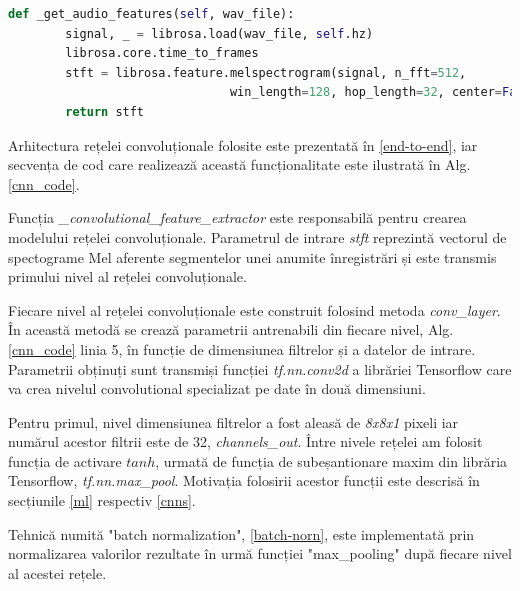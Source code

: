 \documentclass[a4paper,12pt]{book}
\begin{document}
				\begin{lstlisting}[language=Python, caption={Extragerea spectogramei Mel, 3.4.1, folosind libraria librosa.}, xleftmargin=0cm]
  def _get_audio_features(self, wav_file):
		signal, _ = librosa.load(wav_file, self.hz)
		librosa.core.time_to_frames
		stft = librosa.feature.melspectrogram(signal, n_fft=512, 
							   win_length=128, hop_length=32, center=False)
		return stft	\end{lstlisting} \par
				Arhitectura rețelei convoluționale folosite este prezentată în \ref{end-to-end}, iar secvența de cod care realizează această funcționalitate este ilustrată în Alg. \ref{cnn_code}. \par 
				Funcția \textit{\_convolutional\_feature\_extractor} este responsabilă pentru crearea modelului rețelei convoluționale. Parametrul de intrare \textit{stft} reprezintă vectorul de spectograme Mel aferente segmentelor unei anumite înregistrări și este transmis primului nivel al rețelei convoluționale. \par
				Fiecare nivel al rețelei convoluționale este construit folosind metoda \textit{conv\_layer}. În această metodă se crează parametrii antrenabili din fiecare nivel, Alg.\ref{cnn_code} linia 5, în funcție de dimensiunea filtrelor și a datelor de intrare. Parametrii obținuți sunt transmiși funcției \textit{tf.nn.conv2d} a librăriei Tensorflow care va crea nivelul convolutional specializat pe date în două dimensiuni. \par
				Pentru primul, nivel dimensiunea filtrelor a fost aleasă de \textit{8x8x1} pixeli iar numărul acestor filtrii este de 32, \textit{channels\_out}. Între nivele rețelei am folosit funcția de activare $tanh$, urmată de funcția de subeșantionare maxim din librăria Tensorflow, \textit{tf.nn.max\_pool}. Motivația folosirii acestor funcții este descrisă în secțiunile \ref{ml} respectiv \ref{cnns}.
				
				Tehnică numită "batch normalization", \ref{batch-norn}, este implementată prin normalizarea  valorilor rezultate în urmă funcției  "max\_pooling" după fiecare nivel al acestei rețele. \par 
				
\end{document}
